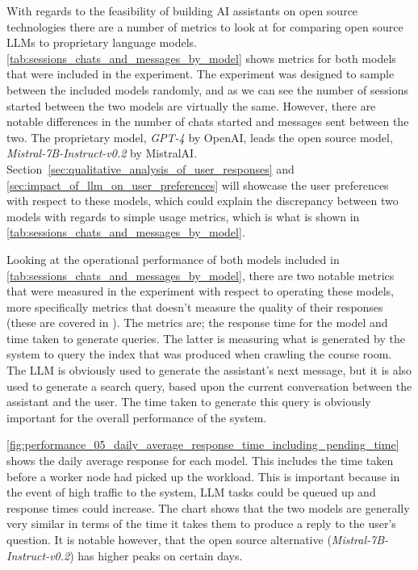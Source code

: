 With regards to the feasibility of building AI assistants on open source technologies there are a number of metrics to look at for comparing open source \gls{LLM}s to proprietary language models. \autoref{tab:sessions_chats_and_messages_by_model} shows metrics for both models that were included in the experiment. The experiment was designed to sample between the included models randomly, and as we can see the number of sessions started between the two models are virtually the same. However, there are notable differences in the number of chats started and messages sent between the two. The proprietary model, \textit{GPT-4} by OpenAI, leads the open source model, \textit{Mistral-7B-Instruct-v0.2} by MistralAI. Section~\ref{sec:qualitative_analysis_of_user_responses} and \ref{sec:impact_of_llm_on_user_preferences} will showcase the user preferences with respect to these models, which could explain the discrepancy between two models with regards to simple usage metrics, which is what is shown in \autoref{tab:sessions_chats_and_messages_by_model}.





Looking at the operational performance of both models included in \autoref{tab:sessions_chats_and_messages_by_model}, there are two notable metrics that were measured in the experiment with respect to operating these models, more specifically metrics that doesn’t measure the quality of their responses (these are covered in \label{sec:impact_of_llm_on_user_preferences}). The metrics are; the response time for the model and time taken to generate queries. The latter is measuring what is generated by the system to query the index that was produced when crawling the course room. The \gls{LLM} is obviously used to generate the assistant's next message, but it is also used to generate a search query, based upon the current conversation between the assistant and the user. The time taken to generate this query is obviously important for the overall performance of the system.


\autoref{fig:performance_05_daily_average_response_time_including_pending_time} shows the daily average response for each model. This includes the time taken before a worker node had picked up the workload. This is important because in the event of high traffic to the system, \gls{LLM} tasks could be queued up and response times could increase. The chart shows that the two models are generally very similar in terms of the time it takes them to produce a reply to the user's question. It is notable however, that the open source alternative (\textit{Mistral-7B-Instruct-v0.2}) has higher peaks on certain days.


